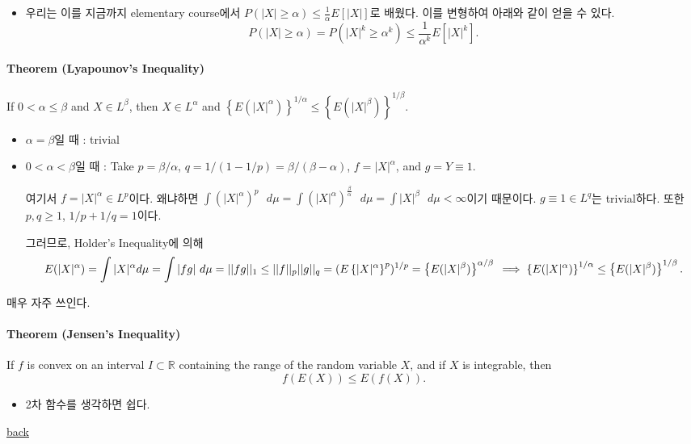 \documentclass[]{article}
\providecommand{\tightlist}{%
  \setlength{\itemsep}{0pt}\setlength{\parskip}{0pt}}
\let\oldparagraph\paragraph
\renewcommand{\paragraph}[1]{\oldparagraph{#1}\mbox{}}
\begin{document}
\begin{itemize}
\tightlist
\item
  우리는 이를 지금까지 elementary course에서
  \(P(|X|\ge \alpha)\le \frac{1}{\alpha}E[|X|]\)로 배웠다. 이를 변형하여
  아래와 같이 얻을 수 있다. \[
    P(|X|\ge \alpha)= P(|X|^k\ge \alpha^k)\le \frac{1}{\alpha^k}E[|X|^k].
     \]
\end{itemize}

\hypertarget{theorem-lyapounovs-inequality}{%
\paragraph{Theorem (Lyapounov's
Inequality)}\label{theorem-lyapounovs-inequality}}

If \(0<\alpha\le\beta\) and \(X\in L^{\beta}\), then \(X\in L^\alpha\)
and
\(\left\{E(|X|^\alpha) \right\}^{1/\alpha}\le \left\{E(|X|^\beta) \right\}^{1/\beta}\).

\begin{itemize}
\item
  \(\alpha=\beta\)일 때 : trivial
\item
  \(0<\alpha<\beta\)일 때 : Take \(p=\beta/\alpha\),
  \(q=1/(1-1/p)=\beta/(\beta-\alpha)\), \(f=|X|^\alpha\), and
  \(g=Y\equiv 1\).

  여기서 \(f=|X|^\alpha \in L^p\)이다. 왜냐하면
  \(\int (|X|^\alpha)^p\mbox{ }d\mu=\int (|X|^\alpha)^\frac{\beta}{\alpha}\mbox{ }d\mu=\int |X|^{\beta}\mbox{ }d\mu<\infty\)이기
  때문이다. \(g\equiv 1 \in L^q\)는 trivial하다. 또한 \(p,q \ge 1\),
  \(1/p+1/q=1\)이다.

  그러므로, Holder's Inequality에 의해 \[
    E(|X|^\alpha)= \int|X|^\alpha d\mu= \int |fg| \mbox{ }d\mu= ||fg||_1 \le ||f||_p||g||_q=({E\left\{|X|^\alpha\right\}^p})^{1/p}= \left\{E(|X|^\beta )\right\}^{\alpha/\beta}\\
    \implies
    \left\{E(|X|^\alpha) \right\}^{1/\alpha}\le \left\{E(|X|^\beta) \right\}^{1/\beta}.
    \]
\end{itemize}

매우 자주 쓰인다.

\hypertarget{theorem-jensens-inequality}{%
\paragraph{Theorem (Jensen's
Inequality)}\label{theorem-jensens-inequality}}

If \(f\) is convex on an interval \(I\subset \mathbb{R}\) containing the
range of the random variable \(X\), and if \(X\) is integrable, then \[
f(E(X))\le E(f(X)).
\]

\begin{itemize}
\tightlist
\item
  2차 함수를 생각하면 쉽다.
\end{itemize}

\href{../probability1.html}{back}
\end{document}

